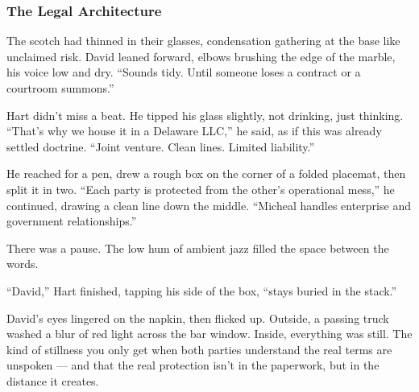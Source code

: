 \medskip

\subsubsection{The Legal Architecture}

The scotch had thinned in their glasses, condensation gathering at the base like unclaimed risk. David leaned forward, 
elbows brushing the edge of the marble, his voice low and dry. “Sounds tidy. Until someone loses a contract or a 
courtroom summons.”

Hart didn’t miss a beat. He tipped his glass slightly, not drinking, just thinking. “That’s why we house it in a 
Delaware LLC,” he said, as if this was already settled doctrine. “Joint venture. Clean lines. Limited liability.”

He reached for a pen, drew a rough box on the corner of a folded placemat, then split it in two. “Each party is 
protected from the other’s operational mess,” he continued, drawing a clean line down the middle. “Micheal 
handles enterprise and government relationships.”

There was a pause. The low hum of ambient jazz filled the space between the words.

“David,” Hart finished, tapping his side of the box, “stays buried in the stack.”

David’s eyes lingered on the napkin, then flicked up. Outside, a passing truck washed a blur of red light across the bar 
window. Inside, everything was still. The kind of stillness you only get when both parties understand the real 
terms are unspoken — and that the real protection isn’t in the paperwork, but in the distance it creates.

\medskip

